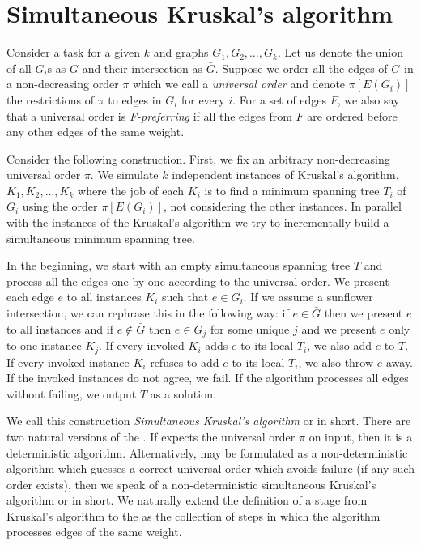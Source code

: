 \section{Simultaneous Kruskal's algorithm}

Consider a \SMST task for a given $k$ and graphs $G_1, G_2, \dots, G_k$. Let us denote the union of all $G_i$s as $G$ and their intersection as $\bar{G}$. Suppose we order all the edges of $G$ in a non-decreasing order $\pi$ which we call a {\em universal order} and denote $\pi[E(G_i)]$ the restrictions of $\pi$ to edges in $G_i$ for every $i$. For a set of edges $F$, we also say that a universal order is {\em F-preferring} if all the edges from $F$ are ordered before any other edges of the same weight. 

Consider the following construction. First, we fix an arbitrary non-decreasing universal order $\pi$. We simulate $k$ independent instances of Kruskal's algorithm, $K_1,K_2,...,K_k$ where the job of each $K_i$ is to find a minimum spanning tree $T_i$ of $G_i$ using the order $\pi[E(G_i)]$, not considering the other instances. In parallel with the instances of the Kruskal's algorithm we try to incrementally build a simultaneous minimum spanning tree. 

In the beginning, we start with an empty simultaneous spanning tree $T$ and process all the edges one by one according to the universal order. We present each edge $e$ to all instances $K_i$ such that $e \in G_i$. If we assume a sunflower intersection, we can rephrase this in the following way: if $e \in \bar{G}$ then we present $e$ to all instances and if $e \notin \bar{G}$ then $e \in G_j$ for some unique $j$ and we present $e$ only to one instance $K_j$. If every invoked $K_i$ adds $e$ to its local $T_i$, we also add $e$ to $T$. If every invoked instance $K_i$ refuses to add $e$ to its local $T_i$, we also throw $e$ away. If the invoked instances do not agree, we fail. If the algorithm processes all edges without failing, we output $T$ as a solution. 

We call this construction {\em Simultaneous Kruskal's algorithm} or \SKA in short. There are two natural versions of the \SKA. If \SKA expects the universal order $\pi$ on input, then it is a deterministic algorithm. Alternatively, \SKA may be formulated as a non-deterministic algorithm which guesses a correct universal order which avoids failure (if any such order exists), then we speak of a non-deterministic simultaneous Kruskal's algorithm or \NSKA in short. We naturally extend the definition of a stage from Kruskal's algorithm to the \NISKA as the collection of steps in which the algorithm processes edges of the same weight. 

